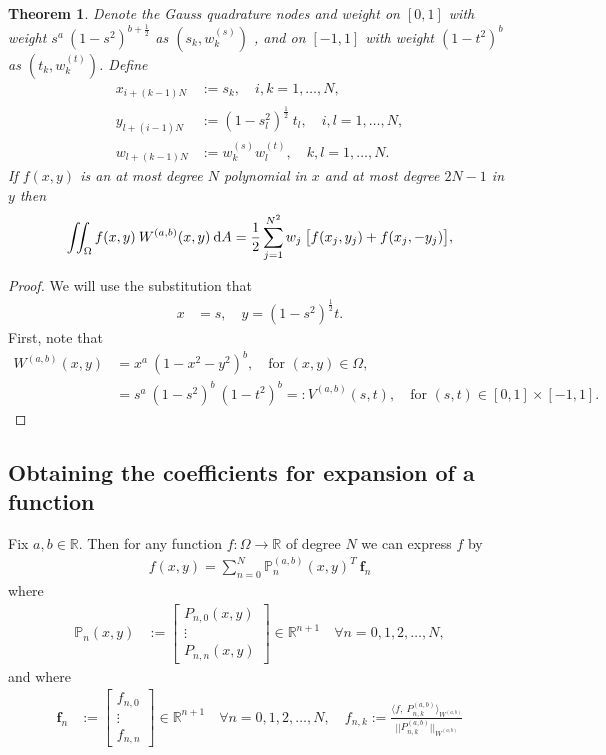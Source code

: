 \documentclass[11pt, oneside]{article}   	%
\newcommand{\half}{\frac{1}{2}}
\newcommand{\R}{\mathbb{R}}
\newcommand{\bigP}{\mathbb{P}}
\newcommand{\Pnk}{P_{n,k}}
\newcommand{\Wab}{{W^{(a,b)}}}
\newtheorem{theorem}{Theorem}
\begin{document}
\begin{theorem}

Denote the  Gauss quadrature nodes and weight on \([0,1]\) with weight \(s^a \: (1-s^2)^{b+\half}\) as $(s_k,w_k^{(s)})$ , and
 on \([-1,1]\) with weight \((1-t^2)^b\) as $(t_k,w_k^{(t)})$. Define
\begin{align}
x_{i+(k-1)N} &:= s_k, \quad i,k = 1,\dots,N, \\
y_{l+(i-1)N} &:= (1-s_l^2)^\half \: t_l, \quad i,l = 1,\dots,N, \\
w_{l+(k-1)N} &:= w_k^{(s)} w_l^{(t)}, \quad k,l = 1,\dots,N.
\end{align}
If $f(x,y)$ is an at most degree $N$ polynomial in $x$ and at most degree $2N-1$ in $y$ then
$$
\iint_\Omega f(x,y) \: \Wab(x,y) \: \D A = \half \sum_{j=1}^{N^2} w_j \: \big[ f(x_j, y_j) + f(x_j, -y_j) \big],
$$

\end{theorem}
\begin{proof}

We will use the substitution that
\begin{align}
x &= s, \quad y = (1-s^2)^\half t.
\end{align}
First, note that
\begin{align}
W^{(a,b)}(x,y) &= x^a \: (1-x^2-y^2)^b, \quad \text{for } (x,y) \in \Omega, \\
		      &= s^a \: (1-s^2)^{b} \: (1-t^2)^b =: V^{(a,b)}(s,t), \quad \text{for } (s,t) \in [0,1] \times [-1,1].
\end{align}

\end{proof}




\subsection{Obtaining the coefficients for expansion of a function}

Fix \(a,b \in \R\). Then for any function \(f : \Omega \to \R\) of degree $N$ we can express \(f\) by
\begin{align*}
f(x,y) = \sum_{n=0}^N \bigP_n^{(a,b)}(x,y)^T \: \mathbf{f}_n
\end{align*}
where
\begin{align*}
\bigP_n(x,y) &:= \begin{bmatrix}
		P_{n,0}(x,y) \\
		\vdots \\
		P_{n,n}(x,y)
	\end{bmatrix} \in \R^{n+1} \quad \forall n = 0,1,2,\dots,N,
\end{align*}
and where
\begin{align*}
\mathbf{f}_n &:= \begin{bmatrix}
		f_{n,0} \\
		\vdots \\
		f_{n,n}
	\end{bmatrix} \in \R^{n+1} \quad \forall n = 0,1,2,\dots,N, \quad
f_{n,k} := \frac{\langle f, \: \Pnk^{(a,b)} \rangle_{W^{(a,b)}}}{|| \Pnk^{(a,b)} ||_{W^{(a,b)}}}
\end{align*}
\end{document}
